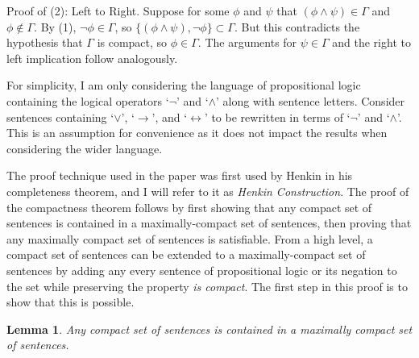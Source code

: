 \documentclass[12pt]{article}
\newtheorem{lemma}[theorem]{Lemma}
\theoremstyle{definition}
\theoremstyle{remark}
\begin{document}
Proof of (2): Left to Right. Suppose for some $\phi$ and $\psi$ that $(\phi \land \psi) \in \Gamma$ and $\phi \not\in \Gamma$. By (1), $\neg\phi \in \Gamma$, so $\{ (\phi \land \psi), \neg\phi \} \subset \Gamma$. But this contradicts the hypothesis that $\Gamma$ is compact, so $\phi \in \Gamma$. The arguments for $\psi \in \Gamma$ and the right to left implication follow analogously.

For simplicity, I am only considering the language of propositional logic containing the logical operators `$\neg$' and `$\land$' along with sentence letters. Consider sentences containing `$\lor$', `$\rightarrow$', and `$\leftrightarrow$' to be rewritten in terms of `$\neg$' and `$\land$'. This is an assumption for convenience as it does not impact the results when considering the wider language. 

The proof technique used in the paper was first used by Henkin in his completeness theorem, and I will refer to it as \textit{Henkin Construction}. The proof of the compactness theorem follows by first showing that any compact set of sentences is contained in a maximally-compact set of sentences, then proving that any maximally compact set of sentences is satisfiable. From a high level, a compact set of sentences can be extended to a maximally-compact set of sentences by adding any every sentence of propositional logic or its negation to the set while preserving the property \textit{is compact}. The first step in this proof is to show that this is possible.



\begin{lemma}
	\label{lem:prop-maximal}
	Any compact set of sentences is contained in a maximally compact set of sentences.
\end{lemma}
\end{document}

